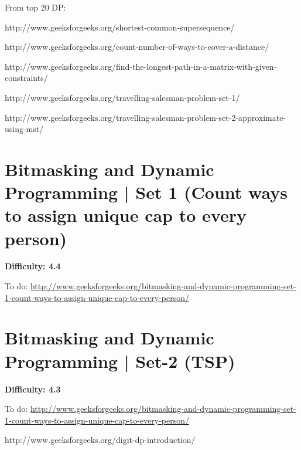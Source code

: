 \RayNotesBegin



\RayNotesEnd

\textbf{}







From top 20 DP:

http://www.geeksforgeeks.org/shortest-common-supersequence/

http://www.geeksforgeeks.org/count-number-of-ways-to-cover-a-distance/

http://www.geeksforgeeks.org/find-the-longest-path-in-a-matrix-with-given-constraints/





http://www.geeksforgeeks.org/travelling-salesman-problem-set-1/

http://www.geeksforgeeks.org/travelling-salesman-problem-set-2-approximate-using-mst/



\section{Bitmasking and Dynamic Programming | Set 1 (Count ways to assign
  unique cap to every person)}

\textbf{Difficulty: 4.4}

To do: \url{http://www.geeksforgeeks.org/bitmasking-and-dynamic-programming-set-1-count-ways-to-assign-unique-cap-to-every-person/}



\section{Bitmasking and Dynamic Programming | Set-2 (TSP)}

\textbf{Difficulty: 4.3}

To do: \url{http://www.geeksforgeeks.org/bitmasking-and-dynamic-programming-set-1-count-ways-to-assign-unique-cap-to-every-person/}


http://www.geeksforgeeks.org/digit-dp-introduction/



















